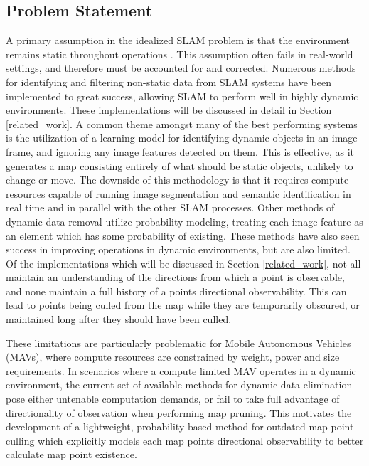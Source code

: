 \subsection{Problem Statement}

A primary assumption in the idealized SLAM problem is that the environment remains static throughout operations \cite{PLACEHOLDER}. This assumption often fails in real-world settings, and therefore must be accounted for and corrected. Numerous methods for identifying and filtering non-static data from SLAM systems have been implemented to great success, allowing SLAM to perform well in highly dynamic environments. These implementations will be discussed in detail in Section \ref{related_work}. A common theme amongst many of the best performing systems is the utilization of a learning model for identifying dynamic objects in an image frame, and ignoring any image features detected on them. This is effective, as it generates a map consisting entirely of what should be static objects, unlikely to change or move. The downside of this methodology is that it requires compute resources capable of running image segmentation and semantic identification in real time and in parallel with the other SLAM processes. Other methods of dynamic data removal utilize probability modeling, treating each image feature as an element which has some probability of existing. These methods have also seen success in improving operations in dynamic environments, but are also limited. Of the implementations which will be discussed in Section \ref{related_work}, not all maintain an understanding of the directions from which a point is observable, and none maintain a full history of a points directional observability. This can lead to points being culled from the map while they are temporarily obscured, or maintained long after they should have been culled.

These limitations are particularly problematic for Mobile Autonomous Vehicles (MAVs), where compute resources are constrained by weight, power and size requirements. In scenarios where a compute limited MAV operates in a dynamic environment, the current set of available methods for dynamic data elimination pose either untenable computation demands, or fail to take full advantage of directionality of observation when performing map pruning. This motivates the development of a lightweight, probability based method for outdated map point culling which explicitly models each map points directional observability to better calculate map point existence.
